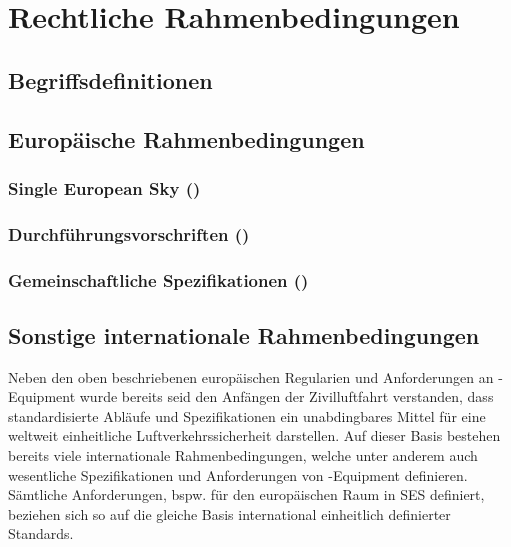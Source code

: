 \chapter{Rechtliche Rahmenbedingungen}

    \section{Begriffsdefinitionen}
        
        \pagebreak
        
    \section{Europäische Rahmenbedingungen}
        \subsection{Single European Sky ()}
            
            
        \subsection{Durchführungsvorschriften ()}
            
                \pagebreak
        
        \subsection{Gemeinschaftliche Spezifikationen ()}
            
                \pagebreak

    \section{Sonstige internationale Rahmenbedingungen}

Neben den oben beschriebenen europäischen Regularien und Anforderungen an \atmans-Equipment wurde bereits seid den Anfängen der Zivilluftfahrt verstanden, dass standardisierte Abläufe und Spezifikationen ein unabdingbares Mittel für eine weltweit einheitliche Luftverkehrssicherheit darstellen.
\cite[156]{eu_icao_milde}
Auf dieser Basis bestehen bereits viele internationale Rahmenbedingungen, welche unter anderem auch wesentliche Spezifikationen und Anforderungen von \atmans-Equipment definieren.
Sämtliche Anforderungen, bspw. für den europäischen Raum in \ac{SES} definiert, beziehen sich so auf die gleiche Basis international einheitlich definierter Standards.

